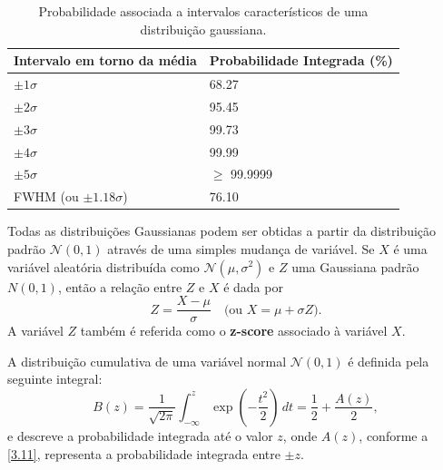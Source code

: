\begin{table}
	\centering
	\begin{tabular}{|l|l|}
		\hline
		Intervalo em torno da média & Probabilidade Integrada (\%) \\ \hline
		$\pm 1\sigma$               & 68.27                        \\ \hline
		$\pm 2\sigma$               & 95.45                        \\ \hline
		$\pm 3\sigma$               & 99.73                        \\ \hline
		$\pm 4\sigma$               & 99.99                        \\ \hline
		$\pm 5\sigma$               & $\geq$ 99.9999               \\ \hline
		FWHM (ou $\pm 1.18 \sigma$) & 76.10                        \\ \hline
	\end{tabular}
	\caption{Probabilidade associada a intervalos característicos de uma distribuição gaussiana.}
	\label{tab:3-2}
\end{table}

Todas as distribuições Gaussianas podem ser obtidas a partir da distribuição padrão $\mathcal{N}(0, 1)$ através de uma simples mudança de variável. Se $X$ é uma variável aleatória distribuída como $\mathcal{N}(\mu, \sigma^2)$ e $Z$ uma Gaussiana padrão $N(0, 1)$, então a relação entre $Z$ e $X$ é dada por
\begin{equation}\label{3.12}
Z = \dfrac{X - \mu}{\sigma} \quad \text{(ou } X = \mu + \sigma Z \text{)}.
\end{equation}
A variável $Z$ também é referida como o \textbf{z-score} associado à variável $X$.

A distribuição cumulativa de uma variável normal $\mathcal{N}(0, 1)$ é definida pela seguinte integral:
\begin{equation}\label{3.13}
	 B(z) = \dfrac{1}{\sqrt{2\pi}} \int_{-\infty}^{z} \exp\left(-\frac{t^2}{2}\right)\,dt = \dfrac{1}{2} + \dfrac{A(z)}{2},
\end{equation}
e descreve a probabilidade integrada até o valor $z$, onde $A(z)$, conforme a \autoref{3.11}, representa a probabilidade integrada entre $\pm z$.

